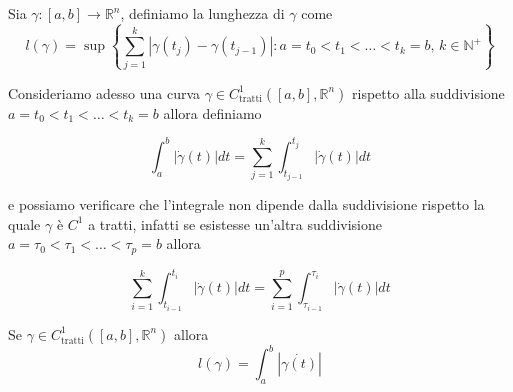\vspace{0.5cm}
\begin{definition}[\textcolor{blue}{lunghezza di una curva $\gamma$}] 
	Sia $\gamma : [a,b] \to \mathbb{R}^n$, definiamo la lunghezza di $\gamma$ come
	$$
		\mathit{l}(\gamma) = \sup \left\{ \sum_{j=1}^k |\gamma(t_j)-\gamma(t_{j-1})| : a = t_0 < t_1 < \ldots < t_k = b, \, k \in \mathbb{N}^+ \right\}
	$$
\end{definition}

Consideriamo adesso una curva $\gamma \in C^1_{\text{tratti}}([a, b], \mathbb{R}^n)$ rispetto alla suddivisione $a=t_0 < t_1 < \ldots < t_k = b$ allora definiamo

$$
\int_a^b |\dot{\gamma}(t)|dt = \sum_{j=1}^k \int_{t_{j-1}}^{t_j} |\dot{\gamma}(t)|dt 
$$

e possiamo verificare che l'integrale non dipende dalla suddivisione rispetto la quale $\gamma$ è $C^1$ a tratti, infatti se esistesse un'altra suddivisione $a=\tau_0 < \tau_1 < \ldots < \tau_p = b$ allora

$$
\sum_{i=1}^k \int_{t_{i-1}}^{t_{i}} |\dot{\gamma}(t)|dt = \sum_{i=1}^p \int_{\tau_{i-1}}^{\tau_{i}} |\dot{\gamma}(t)|dt
$$

\vspace{0.5cm}
\begin{theorem}
Se $\gamma \in C^1_{\text{tratti}}([a, b], \mathbb{R}^n)$ allora
$$
\mathit{l}(\gamma) = \int_a^b |\dot{\gamma(t)}|
$$
\end{theorem}

